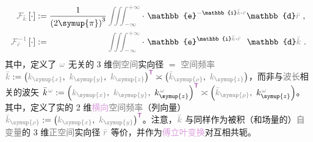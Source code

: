 \begin{subequations} \label{eq:FT-rk}
	\abovedisplayskip=10pt
	\belowdisplayskip=12pt
\begin{align}
	\mathcolor{gray}{\mathcal F_{\bar{k}}} \left[ \cdot \right] &:= \frac{ 1 }{ \left( 2\symup{\pi} \right)^3 } \mathcolor{gray}{\iiint_{-\infty}^{+\infty}} \cdot~ \mathbb{e}^{-\mathbb{i}\mathcolor{gray}{\bar{k}} \cdot \mathcolor{gray}{\bar{r}}} \mathbb{d}\mathcolor{gray}{\bar{r}} ~, \label{eq:FT-k} \\
	\mathcolor{gray}{\mathcal F_{\bar{r}}^{-1}} \left[ \cdot \right] &:= \hphantom{\frac{ 1 }{ \left( 2\symup{\pi} \right)^3 }} \mathcolor{gray}{\iiint_{-\infty}^{+\infty}} \cdot~ \mathbb{e}^{\mathbb{i}\mathcolor{gray}{\bar{k}} \cdot \mathcolor{gray}{\bar{r}}} \hphantom{^-} \mathbb{d}\mathcolor{gray}{\bar{k}} ~. \label{eq:IFT-r}
\end{align}
\end{subequations}
其中，定义了 $\mathcolor{gray}{\omega}$ 无关的 3 维\textcolor{gray}{倒空间}实向径 $=$ \textcolor{gray}{空间频率} $\mathcolor{gray}{\bar{k}} := \left( \mathcolor{gray}{k_{\symup{x}}},~ \mathcolor{gray}{k_{\symup{y}}},~ \mathcolor{gray}{k_{\symup{z}}} \right)^{\mathsf{\textcolor{Plum}{T}}} \asymp \left( \mathcolor{gray}{\bar{k}_{\symup{\rho}}},~ \mathcolor{gray}{k_{\symup{z}}} \right)$，而非与\textcolor{gray}{波长}相关的\textcolor{PineGreen}{波矢} $\bar{k}^{\;\! \mathcolor{gray}{\omega}} := \left( \mathcolor{gray}{k_{\symup{x}}},~ \mathcolor{gray}{k_{\symup{y}}},~ k_{\symup{z}}^{\;\! \mathcolor{gray}{\omega}} \right)^{\mathsf{\textcolor{Plum}{T}}} \asymp \left( \mathcolor{gray}{\bar{k}_{\symup{\rho}}},~ k_{\symup{z}}^{\;\! \mathcolor{gray}{\omega}} \right)$。其中，定义了实的 2 维\textcolor{Plum}{横向}\textcolor{gray}{空间频率}（列向量） $\mathcolor{gray}{\bar{k}_{\symup{\rho}}} := \left( \mathcolor{gray}{k_{\symup{x}}},~ \mathcolor{gray}{k_{\symup{y}}} \right)^{\mathsf{\textcolor{Plum}{T}}}$。注意，$\mathcolor{gray}{\bar{k}}$ 与同样作为被积（和\textcolor{NavyBlue}{场量}的）\textcolor{gray}{自变量}的 3 维\textcolor{gray}{正空间}实向径 $\mathcolor{gray}{\bar{r}}$ 等价，并作为\textcolor{Plum}{傅立叶变换}对互相共轭。

